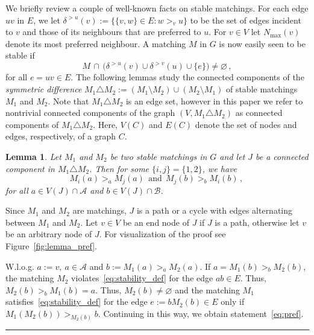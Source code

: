 \documentclass[3p,times]{elsarticle}
\newtheorem{lemma}[fact]{Lemma}
\newenvironment{proof}{{\bf Proof:  }}{\hfill\rule{2mm}{2mm}}
\newcommand{\cA}{\mathcal{A}} \newcommand{\cB}{\mathcal{B}}
\begin{document}
We briefly review a couple of well-known facts on stable matchings. 
For each edge $uv$ in $E$, we let
$\delta^{>u}(v):=\{ \{v,w\}\in E: w >_v u \}$ to be the set of edges
incident to $v$ and those of its neighbours that are preferred to $u$. 
For $v \in V$ let $N_{\max}(v)$ denote its most preferred neighbour.  
A matching $M$ in $G$ is now easily seen to be stable if 
\begin{equation}\label{eq:stability_def}
		M \, \cap \, \big(\delta^{>u}(v) \cup \delta^{>v}(u) \cup  \{e\} \big)\neq\varnothing\,,
\end{equation}
for all $e=uv \in E$. The following lemmas study the connected components of
the {\em symmetric difference} $M_1\triangle M_2:=(M_1\setminus M_2)
\cup (M_2 \setminus M_1)$ of 
stable matchings $M_1$ and $M_2$. Note that $M_1\triangle M_2$ is an edge set, however in this paper we refer to nontrivial connected components of the graph $(V, M_1\triangle M_2)$ as connected components of $M_1\triangle M_2$. Here, $V(C)$ and $E(C)$ denote
the set of nodes and edges, respectively, of a graph $C$.

\begin{lemma}\label{lemma:pref}
Let $M_1$ and $M_2$ be two stable matchings in $G$ and let $J$ be a
connected component in $M_1 \triangle M_2$. Then for some
$\{i,j\}=\{1,2\}$, we have
\begin{equation}\label{eq:pref}
	M_i(a)>_a M_j(a) ~~\text{and} ~~  M_j(b)>_b M_i(b)\,,\,
\end{equation}
for all $a \in V(J) \cap \cA$ and $b \in V(J) \cap \cB$.
\end{lemma}
\begin{proof}
  Since $M_1$ and $M_2$ are matchings, $J$ is a path or a cycle with edges alternating between $M_1$ and $M_2$. Let
  $v\in V$ be an end node of $J$ if $J$ is a path, otherwise let $v$
  be an arbitrary node of $J$. For visualization of the proof see Figure~\ref{fig:lemma_pref}.

  W.l.o.g. $a:=v,\ a\in \mathcal{A}$ and $b:=M_1(a) >_a M_2(a)$. If
  $a=M_1(b) >_b M_2(b)$, the matching $M_2$
  violates~\eqref{eq:stability_def} for the edge $ab\in E$. Thus,
  $M_2(b) >_b M_1(b)=a$. Thus, $M_2(b)\neq \varnothing$ and the
  matching $M_1$ satisfies~\eqref{eq:stability_def} for the edge
  $e:=bM_2(b)\in E$ only if $M_1(M_2(b))>_{M_2(b)} b$. Continuing
  in this way, we obtain statement~\eqref{eq:pref}.
\end{proof}
\end{document}
